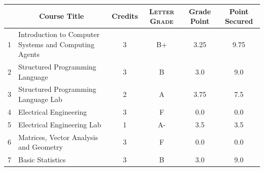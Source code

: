 \documentclass[11pt]{article}
\newcommand*{\numtwo}[1]{\pgfmathprintnumber[
                    fixed, precision=2, fixed zerofill=true]{#1}}
\begin{document}
                \begin{center}
                    \renewcommand{\arraystretch}{1.08}
                    
                \begin{tabular}{|c|l|c|>{\scshape}c|c|c|}
                \hline  \rule[-1ex]{0pt}{3.5ex} {\centering{\bf Course Code}} &  \multicolumn{1}{c|}{\textbf{Course Title}}  & {\bf Credits} & {\bf Letter Grade} & {\bf Grade Point} & {\bf Point Secured}  \\ 
                \hline   1 &  Introduction to Computer Systems and Computing Agents		 & 3 & B+ & 3.25 & 9.75 \\ %
                \hline   2 &  Structured Programming Language		 & 3 & B & 3.0 & 9.0 \\ %
                \hline   3 &  Structured Programming Language Lab		 & 2 & A & 3.75 & 7.5 \\ %
                \hline   4 &  Electrical Engineering		 & 3 & F & 0.0 & 0.0 \\ %
                \hline   5 &  Electrical Engineering Lab		 & 1 & A- & 3.5 & 3.5 \\ %
                \hline   6 &  Matrices, Vector Analysis and Geometry		 & 3 & F & 0.0 & 0.0 \\ %
                \hline   7 &  Basic Statistics		 & 3 & B & 3.0 & 9.0 \\ %

\hline                %
                \end{tabular}
                \end{center}
                \renewcommand{\arraystretch}{1.03}
\end{document}
